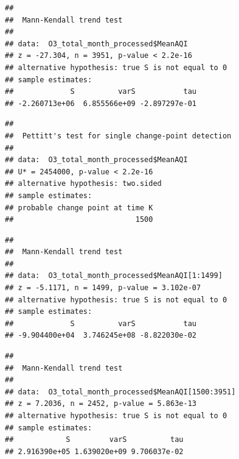 \documentclass[12pt,]{article}
\newenvironment{Shaded}{\begin{snugshade}}{\end{snugshade}}
\newcommand{\KeywordTok}[1]{\textcolor[rgb]{0.13,0.29,0.53}{\textbf{#1}}}
\newcommand{\DecValTok}[1]{\textcolor[rgb]{0.00,0.00,0.81}{#1}}
\newcommand{\CommentTok}[1]{\textcolor[rgb]{0.56,0.35,0.01}{\textit{#1}}}
\newcommand{\OperatorTok}[1]{\textcolor[rgb]{0.81,0.36,0.00}{\textbf{#1}}}
\newcommand{\NormalTok}[1]{#1}
\begin{document}
\begin{verbatim}
## 
##  Mann-Kendall trend test
## 
## data:  O3_total_month_processed$MeanAQI
## z = -27.304, n = 3951, p-value < 2.2e-16
## alternative hypothesis: true S is not equal to 0
## sample estimates:
##             S          varS           tau 
## -2.260713e+06  6.855566e+09 -2.897297e-01
\end{verbatim}

\begin{Shaded}
\end{Shaded}

\begin{verbatim}
## 
##  Pettitt's test for single change-point detection
## 
## data:  O3_total_month_processed$MeanAQI
## U* = 2454000, p-value < 2.2e-16
## alternative hypothesis: two.sided
## sample estimates:
## probable change point at time K 
##                            1500
\end{verbatim}

\begin{Shaded}
\end{Shaded}

\begin{verbatim}
## 
##  Mann-Kendall trend test
## 
## data:  O3_total_month_processed$MeanAQI[1:1499]
## z = -5.1171, n = 1499, p-value = 3.102e-07
## alternative hypothesis: true S is not equal to 0
## sample estimates:
##             S          varS           tau 
## -9.904400e+04  3.746245e+08 -8.822030e-02
\end{verbatim}

\begin{Shaded}
\end{Shaded}

\begin{verbatim}
## 
##  Mann-Kendall trend test
## 
## data:  O3_total_month_processed$MeanAQI[1500:3951]
## z = 7.2036, n = 2452, p-value = 5.863e-13
## alternative hypothesis: true S is not equal to 0
## sample estimates:
##            S         varS          tau 
## 2.916390e+05 1.639020e+09 9.706037e-02
\end{verbatim}
\end{document}
